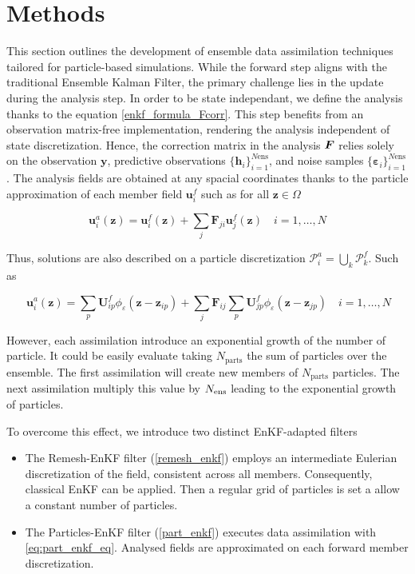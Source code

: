 
\section{Methods}\label{Methods}

This section outlines the development of ensemble data assimilation techniques tailored for particle-based simulations. While the forward step aligns with the traditional Ensemble Kalman Filter, the primary challenge lies in the update during the analysis step. In order to be state independant, we define the analysis thanks to the equation \eqref{enkf_formula_Fcorr}. This step benefits from an observation matrix-free implementation, rendering the analysis independent of state discretization. Hence, the correction matrix in the analysis $\bm{F}$ relies solely on the observation $\bm{y}$, predictive observations $\{\bm h_i\}_{i=1}^{N{\text{ens}}}$, and noise samples $\{\bm \varepsilon_i\}_{i=1}^{N{\text{ens}}}$. The analysis fields are obtained at any spacial coordinates thanks to the particle approximation of each member field $\bm u^f_i$ such as for all $\bm z \in \Omega$

\begin{equation*}
    \bm u^a_i(\bm z) = \bm u^f_i(\bm z) + \sum_{j} \bm F_{ji} \bm u^f_j(\bm z) \quad i = 1,\dots, N
\end{equation*}

Thus, solutions are also described on a particle discretization $\mathcal{P}^a_i = \bigcup_k \mathcal{P}_k^f$. Such as

\begin{equation}~\label{eq:part_enkf_eq}
    \bm u^a_i(\bm z) = \sum_p \bm U^f_{ip} \phi_{\varepsilon}(\bm z - \bm z_{ip}) + \sum_{j} \bm F_{ij} \sum_p \bm U^f_{jp} \phi_{\varepsilon}(\bm z- \bm z_{jp}) \quad i = 1,\dots, N
\end{equation}

However, each assimilation introduce an exponential growth of the number of particle. It could be easily evaluate taking $N_{\text{parts}}$ the sum of particles over the ensemble. The first assimilation will create new members of $N_{\text{parts}}$ particles. The next assimilation multiply this value by $N_{\text{ens}}$ leading to the exponential growth of particles.

To overcome this effect, we introduce two distinct EnKF-adapted filters

\begin{itemize}
    \item The Remesh-EnKF filter (\ref{remesh_enkf}) employs an intermediate Eulerian discretization of the field, consistent across all members. Consequently, classical EnKF can be applied. Then a regular grid of particles is set a allow a constant number of particles.
    \item The Particles-EnKF filter (\ref{part_enkf}) executes data assimilation with \eqref{eq:part_enkf_eq}. Analysed fields are approximated on each forward member discretization.
\end{itemize}


